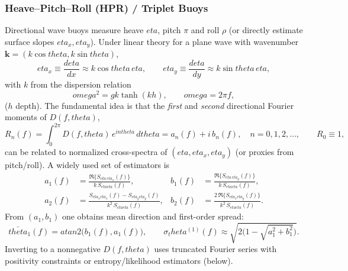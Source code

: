 \documentclass[journal,10pt,twocolumn]{IEEEtran}
\def\omega{omega}%
\def\eta{eta}%
\def\theta{theta}%
\def\partial{d}%
\def\mathrm#1{#1}%
\begin{document}
    \subsubsection{Heave--Pitch--Roll (HPR) / Triplet Buoys}
    Directional wave buoys measure heave $\eta$, pitch $\pi$ and roll $\rho$ (or directly estimate surface slopes $\eta_x,\eta_y$). Under linear theory for a plane wave with wavenumber $\mathbf{k}=(k\cos\theta,k\sin\theta)$,
    \begin{equation}
        \eta_x \equiv \frac{\partial\eta}{\partial x} \approx k\cos\theta\,\eta,
        \qquad
        \eta_y \equiv \frac{\partial\eta}{\partial y} \approx k\sin\theta\,\eta,
    \end{equation}
    with $k$ from the dispersion relation
    \begin{equation}
        \omega^2 = gk\tanh(kh), \qquad \omega=2\pi f,
        \label{eq:dispersion_dir}
    \end{equation}
    ($h$ depth). The fundamental idea is that the \emph{first} and \emph{second} directional Fourier moments of $D(f,\theta)$,
    \begin{equation}
        R_n(f) = \int_{0}^{2\pi} D(f,\theta)\, e^{\mathrm{i}n\theta}\, d\theta
        = a_n(f) + \mathrm{i}\,b_n(f), \quad n=0,1,2,\ldots,
        \qquad R_0\equiv1,
    \end{equation}
    can be related to normalized cross-spectra of $(\eta,\eta_x,\eta_y)$ (or proxies from pitch/roll). A widely used set of estimators is
    \begin{align}
        a_1(f) &= \frac{\Re\{ S_{\eta\,\eta_x}(f)\}}{k\,S_{\eta\eta}(f)},
        &
        b_1(f) &= \frac{\Re\{ S_{\eta\,\eta_y}(f)\}}{k\,S_{\eta\eta}(f)},\\
        a_2(f) &= \frac{S_{\eta_x\eta_x}(f) - S_{\eta_y\eta_y}(f)}{k^2\,S_{\eta\eta}(f)},
        &
        b_2(f) &= \frac{2\,\Re\{ S_{\eta_x\eta_y}(f)\}}{k^2\,S_{\eta\eta}(f)}.
        \label{eq:a1b1a2b2}
    \end{align}
    From $(a_1,b_1)$ one obtains mean direction and first-order spread:
    \begin{equation}
        \bar{\theta}_1(f) = \mathrm{atan2}\!\big(b_1(f),a_1(f)\big),
        \qquad
        \sigma_\theta^{(1)}(f) \approx \sqrt{2\big(1-\sqrt{a_1^2+b_1^2}\big)}.
    \end{equation}
    Inverting to a nonnegative $D(f,\theta)$ uses truncated Fourier series with positivity constraints or entropy/likelihood estimators (below).
\end{document}

